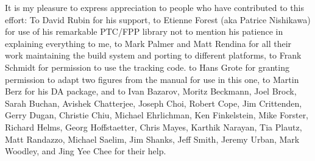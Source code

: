 It is my pleasure to express appreciation to people who have
contributed to this effort: To David Rubin for his support, to Etienne
Forest (aka Patrice Nishikawa) for use of his remarkable PTC/FPP
library not to mention his patience in explaining everything to me, to
Mark Palmer and Matt Rendina for all their work maintaining the build
system and porting \bmad to different platforms, to Frank Schmidt for
permission to use the \mad tracking code. to Hans Grote for granting
permission to adapt two figures from the \mad manual for use in this
one, to Martin Berz for his DA package, and to Ivan Bazarov, Moritz
Beckmann, Joel Brock, Sarah Buchan, Avishek Chatterjee, Joseph Choi,
Robert Cope, Jim Crittenden, Gerry Dugan, Christie Chiu, Michael
Ehrlichman, Ken Finkelstein, Mike Forster, Richard Helms, Georg
Hoffstaetter, Chris Mayes, Karthik Narayan, Tia Plautz, Matt Randazzo,
Michael Saelim, Jim Shanks, Jeff Smith, Jeremy Urban, Mark Woodley,
and Jing Yee Chee for their help.


